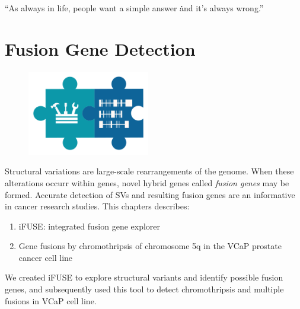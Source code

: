 \begin{savequote}[75mm]
“As always in life, people want a simple answer \. \. \. and it’s always wrong.”
\end{savequote}

\chapter{Fusion Gene Detection}\label{chapter:fusiongenes}
\setcounter{figure}{-1}
\setcounter{table}{-1}
\setcounter{section}{-1}

\begin{figure}[t!]
\includegraphics[height=10em]{frontmatter/images/chapter-header-fusion-tools.png}
\end{figure}
\setcounter{figure}{-1}
\setcounter{table}{-1}
\setcounter{section}{-1}

Structural variations are large-scale rearrangements of the genome. When these alterations occurr within genes, novel hybrid genes called \emph{fusion genes} may be formed. Accurate detection of SVs and resulting fusion genes are an informative in cancer research studies. This chapters describes:

\begin{enumerate}
\itemsep-0.5em
\item iFUSE: integrated fusion gene explorer
\item Gene fusions by chromothripsis of chromosome 5q in the VCaP prostate cancer cell line
\end{enumerate}

We created iFUSE to explore structural variants and identify possible fusion genes, and subsequently used this tool to detect chromothripsis and multiple fusions in VCaP cell line.

